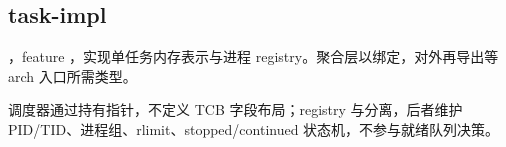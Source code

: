 
\subsection{task-impl}

，feature ，实现单任务内存表示与进程 registry。聚合层以绑定，对外再导出等 arch 入口所需类型。

调度器通过持有指针，不定义 TCB 字段布局；registry 与分离，后者维护 PID/TID、进程组、rlimit、stopped/continued 状态机，不参与就绪队列决策。



